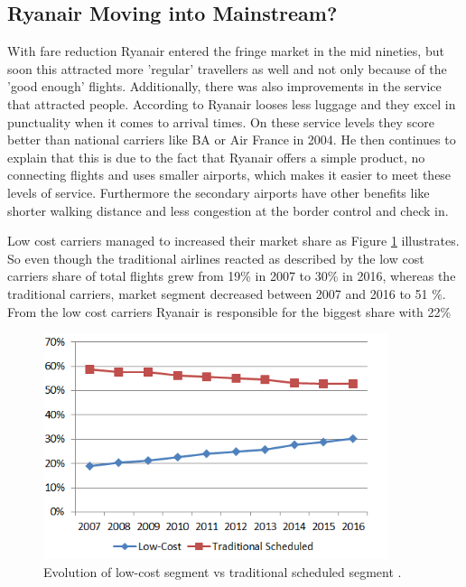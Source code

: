 \documentclass[a4paper, 11pt]{article}
\begin{document}
\subsection{Ryanair Moving into Mainstream?}
\label{limits}


With fare reduction Ryanair entered the fringe market in the mid nineties, but soon this attracted more 'regular' travellers as well and not only because of the 'good enough' flights. Additionally, there was also improvements in the service that attracted people. According to \cite{Barrett} Ryanair looses less luggage and they excel in punctuality when it comes to arrival times. On these service levels they score better than national carriers like BA or Air France in 2004. He \citep{Barrett} then continues to explain that this is due to the fact that Ryanair offers a simple product, no connecting flights and uses smaller airports, which makes it easier to meet these levels of service. Furthermore the secondary airports have other benefits like shorter walking distance and less congestion at the border control and check in.


Low cost carriers managed to increased their market share as Figure \ref{fig:graph2} illustrates. So even though the traditional airlines reacted as described by \citep{Dennis} the low cost carriers share of total flights grew from 19\% in 2007 to 30\% in 2016, whereas the traditional carriers, market segment decreased between 2007 and 2016 to 51 \%. From the low cost carriers Ryanair is responsible for the biggest share with 22\% \citep{Eurocontrol2017}

\begin{figure}[h!]
    \centering
    \includegraphics[width=0.9\textwidth]{evolution-lcc-vs-tradsched.png}
    \caption{Evolution of low-cost segment vs traditional scheduled segment \cite{Eurocontrol2017}.}
    \label{fig:graph2}
\end{figure}
\end{document}
